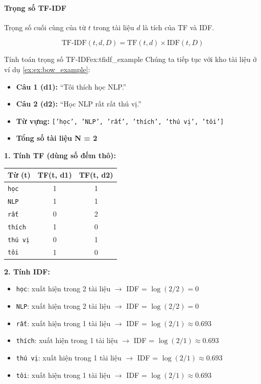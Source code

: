 \paragraph{Trọng số TF-IDF}
Trọng số cuối cùng của từ $t$ trong tài liệu $d$ là tích của TF và IDF.

\begin{equation}
    \text{TF-IDF}(t, d, D) = \text{TF}(t, d) \times \text{IDF}(t, D)
    \label{eq:tfidf}
\end{equation}

\begin{example}{Tính toán trọng số TF-IDF}{ex:tfidf_example}
    Chúng ta tiếp tục với kho tài liệu ở ví dụ \ref{ex:ex:bow_example}:
    \begin{itemize}
        \item \textbf{Câu 1 (d1):} “Tôi thích học NLP.”
        \item \textbf{Câu 2 (d2):} “Học NLP rất rất thú vị.”
        \item \textbf{Từ vựng:} \texttt{['học', 'NLP', 'rất', 'thích', 'thú vị', 'tôi']}
        \item \textbf{Tổng số tài liệu N = 2}
    \end{itemize}

    \textbf{1. Tính TF (dùng số đếm thô):}
    \begin{center}
    \begin{tabular}{|l|c|c|}
        \hline
        \textbf{Từ (t)} & \textbf{TF(t, d1)} & \textbf{TF(t, d2)} \\
        \hline
        \texttt{học} & 1 & 1 \\
        \texttt{NLP} & 1 & 1 \\
        \texttt{rất} & 0 & 2 \\
        \texttt{thích} & 1 & 0 \\
        \texttt{thú vị} & 0 & 1 \\
        \texttt{tôi} & 1 & 0 \\
        \hline
    \end{tabular}
    \end{center}

    \textbf{2. Tính IDF:}
    \begin{itemize}
        \item \texttt{học}: xuất hiện trong 2 tài liệu \(\rightarrow\) IDF = $\log(2/2) = 0$
        \item \texttt{NLP}: xuất hiện trong 2 tài liệu \(\rightarrow\) IDF = $\log(2/2) = 0$
        \item \texttt{rất}: xuất hiện trong 1 tài liệu \(\rightarrow\) IDF = $\log(2/1) \approx 0.693$
        \item \texttt{thích}: xuất hiện trong 1 tài liệu \(\rightarrow\) IDF = $\log(2/1) \approx 0.693$
        \item \texttt{thú vị}: xuất hiện trong 1 tài liệu \(\rightarrow\) IDF = $\log(2/1) \approx 0.693$
        \item \texttt{tôi}: xuất hiện trong 1 tài liệu \(\rightarrow\) IDF = $\log(2/1) \approx 0.693$
    \end{itemize}


\end{example}
